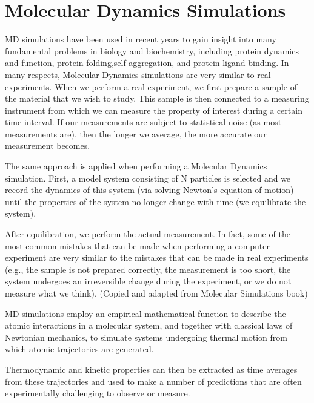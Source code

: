 \chapter{Molecular Dynamics Simulations}

MD simulations have been used in recent years to gain insight into many fundamental problems in biology and biochemistry, including protein dynamics and function, protein folding,self-aggregation, and protein-ligand binding.
In many respects, Molecular Dynamics simulations are very similar to real experiments. When we perform a real experiment, we first prepare a sample of the material that we wish to study. This sample is then connected to a measuring instrument from which we can measure the property of interest during a certain time interval. If our measurements are subject to statistical noise (as most measurements are), then the longer we average, the more accurate our measurement becomes. 

The same approach is applied when performing a Molecular Dynamics simulation. First, a model system consisting of N particles is selected and we record the dynamics of this system (via solving Newton's equation of motion) until the properties of the system no longer change with time (we equilibrate the system). 

After equilibration, we perform the actual measurement. In fact, some of the most common mistakes that can be made when performing a computer experiment are very similar to the mistakes that can be made in real experiments (e.g., the sample is not prepared correctly, the measurement is too short, the system undergoes an irreversible change during the experiment, or we do not measure what we think).
(Copied and adapted from Molecular Simulations book)

MD simulations employ an empirical mathematical function to describe the atomic interactions in a molecular system, and together with classical laws of Newtonian mechanics, to simulate systems undergoing thermal motion from which atomic trajectories are generated. 

Thermodynamic and kinetic properties can then be extracted as time averages from these trajectories and used to make a number of predictions that are often experimentally challenging to observe or measure.

